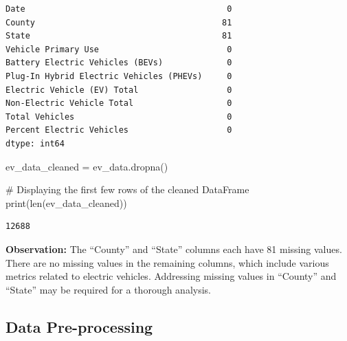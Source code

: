 \documentclass[
  letterpaper,
  DIV=11,
  numbers=noendperiod]{scrartcl}
\newenvironment{Shaded}{\begin{snugshade}}{\end{snugshade}}
\newcommand{\BuiltInTok}[1]{\textcolor[rgb]{0.00,0.23,0.31}{#1}}
\newcommand{\CommentTok}[1]{\textcolor[rgb]{0.37,0.37,0.37}{#1}}
\newcommand{\NormalTok}[1]{\textcolor[rgb]{0.00,0.23,0.31}{#1}}
\newcommand{\OperatorTok}[1]{\textcolor[rgb]{0.37,0.37,0.37}{#1}}
\begin{document}
\begin{verbatim}
Date                                         0
County                                      81
State                                       81
Vehicle Primary Use                          0
Battery Electric Vehicles (BEVs)             0
Plug-In Hybrid Electric Vehicles (PHEVs)     0
Electric Vehicle (EV) Total                  0
Non-Electric Vehicle Total                   0
Total Vehicles                               0
Percent Electric Vehicles                    0
dtype: int64
\end{verbatim}

\begin{Shaded}
\begin{Highlighting}[]
\NormalTok{ev\_data\_cleaned }\OperatorTok{=}\NormalTok{ ev\_data.dropna()}

\CommentTok{\# Displaying the first few rows of the cleaned DataFrame}
\BuiltInTok{print}\NormalTok{(}\BuiltInTok{len}\NormalTok{(ev\_data\_cleaned))}
\end{Highlighting}
\end{Shaded}

\begin{verbatim}
12688
\end{verbatim}

\textbf{Observation:} The ``County'' and ``State'' columns each have 81
missing values. There are no missing values in the remaining columns,
which include various metrics related to electric vehicles. Addressing
missing values in ``County'' and ``State'' may be required for a
thorough analysis.

\hypertarget{data-pre-processing}{%
\subsection{Data Pre-processing}\label{data-pre-processing}}
\end{document}

